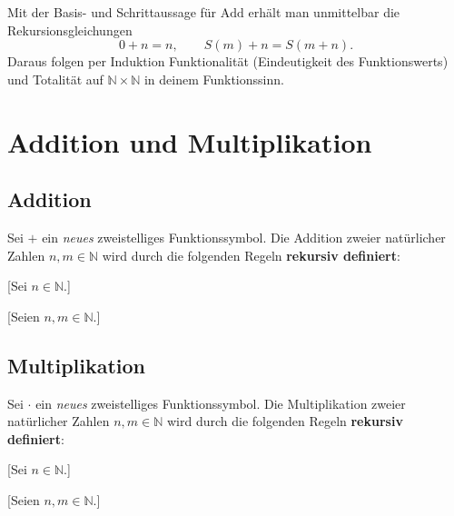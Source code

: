 \documentclass[main.tex]{subfiles}
\begin{document}
\begin{remark}
Mit der Basis- und Schrittaussage für \(\mathrm{Add}\) erhält man unmittelbar die Rekursionsgleichungen
\[
0+n=n,\qquad S(m)+n=S(m+n).
\]
Daraus folgen per Induktion Funktionalität (Eindeutigkeit des Funktionswerts) und Totalität auf \(\mathbb{N}\times\mathbb{N}\) in deinem Funktionssinn.
\end{remark}


\chapter{Addition und Multiplikation}

\section{Addition}

\begin{definition}
Sei \(+\) ein \emph{neues} zweistelliges Funktionssymbol. 
Die Addition zweier natürlicher Zahlen \(n,m \in \mathbb{N}\) 
wird durch die folgenden Regeln \textbf{rekursiv definiert}:
\end{definition}

[Sei \(n \in \mathbb{N}\).]

[Seien \(n,m \in \mathbb{N}\).]


\section{Multiplikation}

\begin{definition}
Sei \(\cdot\) ein \emph{neues} zweistelliges Funktionssymbol. 
Die Multiplikation zweier natürlicher Zahlen \(n,m \in \mathbb{N}\) 
wird durch die folgenden Regeln \textbf{rekursiv definiert}:
\end{definition}

[Sei \(n \in \mathbb{N}\).]

[Seien \(n,m \in \mathbb{N}\).]
\end{document}
